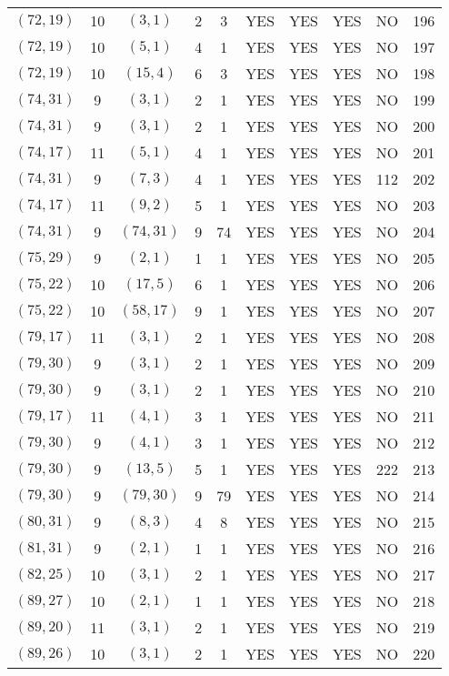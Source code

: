 \begin{longtable}{|c|c|c|c|c|c|c|c|c|c|}
$(72, 19)$ & 10 & $(3, 1)$ & 2 & 3 & YES & YES & YES & NO & 196\\
$(72, 19)$ & 10 & $(5, 1)$ & 4 & 1 & YES & YES & YES & NO & 197\\
$(72, 19)$ & 10 & $(15, 4)$ & 6 & 3 & YES & YES & YES & NO & 198\\
$(74, 31)$ & 9 & $(3, 1)$ & 2 & 1 & YES & YES & YES & NO & 199\\
$(74, 31)$ & 9 & $(3, 1)$ & 2 & 1 & YES & YES & YES & NO & 200\\
$(74, 17)$ & 11 & $(5, 1)$ & 4 & 1 & YES & YES & YES & NO & 201\\
$(74, 31)$ & 9 & $(7, 3)$ & 4 & 1 & YES & YES & YES & 112 & 202\\
$(74, 17)$ & 11 & $(9, 2)$ & 5 & 1 & YES & YES & YES & NO & 203\\
$(74, 31)$ & 9 & $(74, 31)$ & 9 & 74 & YES & YES & YES & NO & 204\\
$(75, 29)$ & 9 & $(2, 1)$ & 1 & 1 & YES & YES & YES & NO & 205\\
$(75, 22)$ & 10 & $(17, 5)$ & 6 & 1 & YES & YES & YES & NO & 206\\
$(75, 22)$ & 10 & $(58, 17)$ & 9 & 1 & YES & YES & YES & NO & 207\\
$(79, 17)$ & 11 & $(3, 1)$ & 2 & 1 & YES & YES & YES & NO & 208\\
$(79, 30)$ & 9 & $(3, 1)$ & 2 & 1 & YES & YES & YES & NO & 209\\
$(79, 30)$ & 9 & $(3, 1)$ & 2 & 1 & YES & YES & YES & NO & 210\\
$(79, 17)$ & 11 & $(4, 1)$ & 3 & 1 & YES & YES & YES & NO & 211\\
$(79, 30)$ & 9 & $(4, 1)$ & 3 & 1 & YES & YES & YES & NO & 212\\
$(79, 30)$ & 9 & $(13, 5)$ & 5 & 1 & YES & YES & YES & 222 & 213\\
$(79, 30)$ & 9 & $(79, 30)$ & 9 & 79 & YES & YES & YES & NO & 214\\
$(80, 31)$ & 9 & $(8, 3)$ & 4 & 8 & YES & YES & YES & NO & 215\\
$(81, 31)$ & 9 & $(2, 1)$ & 1 & 1 & YES & YES & YES & NO & 216\\
$(82, 25)$ & 10 & $(3, 1)$ & 2 & 1 & YES & YES & YES & NO & 217\\
$(89, 27)$ & 10 & $(2, 1)$ & 1 & 1 & YES & YES & YES & NO & 218\\
$(89, 20)$ & 11 & $(3, 1)$ & 2 & 1 & YES & YES & YES & NO & 219\\
$(89, 26)$ & 10 & $(3, 1)$ & 2 & 1 & YES & YES & YES & NO & 220\\

\end{longtable}

